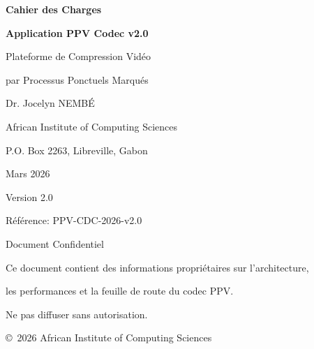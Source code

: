 \documentclass[12pt,a4paper]{article}
\begin{document}
	
	\begin{titlepage}
		\centering
		{\Huge\bfseries\color{ppvblue}Cahier des Charges\par}
		\vspace{0.5cm}
		{\Huge\bfseries Application PPV Codec v2.0\par}
		\vspace{1cm}
		{\Large Plateforme de Compression Vidéo\par}
		{\Large par Processus Ponctuels Marqués\par}
		\vspace{2cm}
		{\large Dr. Jocelyn NEMBÉ\par}
		{\large African Institute of Computing Sciences\par}
		{\large P.O. Box 2263, Libreville, Gabon\par}
		\vspace{1cm}
		{\large Mars 2026\par}
		\vspace{1cm}
		{\large Version 2.0\par}
		\vspace{1cm}
		{\large Référence: PPV-CDC-2026-v2.0\par}
		\vfill
		{\small\color{red}Document Confidentiel\par}
		{\small Ce document contient des informations propriétaires sur l'architecture,\par}
		{\small les performances et la feuille de route du codec PPV.\par}
		{\small Ne pas diffuser sans autorisation.\par}
		{\small \copyright~2026 African Institute of Computing Sciences\par}
	\end{titlepage}
	
	\begin{abstract}
		\noindent Ce cahier des charges décrit les spécifications complètes de l'application PPV Codec v2.0, une plateforme de compression vidéo basée sur les processus ponctuels marqués. Le document couvre les interfaces utilisateurs, le modèle conceptuel de données (MCD), le modèle physique de données (MPD), le modèle conceptuel de traitements (MCT) et le modèle logique de traitements (MLT). L'architecture permet d'atteindre des ratios de compression de 15-20x sur vidéo réelle avec des fonctionnalités impossibles avec les codecs classiques (zoom natif, requêtes sémantiques, adaptation couleur instantanée, navigation 3D).
		
		\medskip
		\noindent \textbf{Mots-clés :} Processus ponctuels, Codage MDL, Compression vidéo, Estimation d'intensité, Distance de Hellinger, Interface utilisateur.
		
		\medskip
		\noindent \textbf{Codes AMS :} 60G55; 62G05; 62G20; 62E25; 94A29.
	\end{abstract}
	
\end{document}
